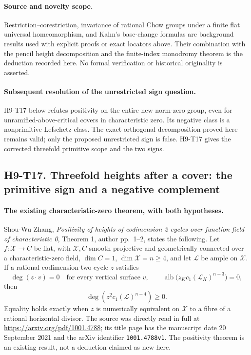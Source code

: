 \documentclass[11pt,a4paper]{article}
\begin{document}
\paragraph{Source and novelty scope.}
Restriction--corestriction, invariance of rational Chow groups under a
finite flat universal homeomorphism, and Kahn's base-change formulas
are background results used with explicit proofs or exact locators
above. Their combination with the pencil height decomposition and
the finite-index monodromy theorem is the deduction recorded here.
No formal verification or historical originality is asserted.

\paragraph{Subsequent resolution of the unrestricted sign question.}
H9-T17 below refutes positivity on the entire new norm-zero group, even
for unramified-above-critical covers in characteristic zero. Its negative
class is a nonprimitive Lefschetz class. The exact orthogonal decomposition
proved here remains valid; only the proposed unrestricted sign is false.
H9-T17 gives the corrected threefold primitive scope and the two signs.



\subsection*{H9-T17. Threefold heights after a cover: the primitive sign and a negative complement}

\paragraph{The existing characteristic-zero theorem, with both hypotheses.}
Shou-Wu Zhang, \emph{Positivity of heights of codimension 2 cycles
over function field of characteristic 0}, Theorem 1, author pp.~1--2,
states the following. Let $f:\mathcal X\to C$ be flat, with
$\mathcal X,C$ smooth projective and geometrically connected over a
characteristic-zero field, $\dim C=1$, $\dim\mathcal X=n\ge4$,
and let $\mathcal L$ be ample on $\mathcal X$. If a rational
codimension-two cycle $z$ satisfies
\[
 \deg(z\cdot v)=0\quad\text{for every vertical surface }v,
 \qquad
 \operatorname{alb}\bigl(z_Kc_1(\mathcal L_K)^{n-3}\bigr)=0,
                                                               \tag{H9.77}
\]
then
\[
                  \deg(z^2c_1(\mathcal L)^{n-4})\ge0.
                                                               \tag{H9.78}
\]
Equality holds exactly when $z$ is numerically equivalent on
$\mathcal X$ to a fibre of a rational horizontal divisor.
The source was directly read in full at
\url{https://arxiv.org/pdf/1001.4788}; its title page has the
manuscript date 20 September 2021 and the arXiv identifier
\texttt{1001.4788v1}. The positivity theorem is an existing result,
not a deduction claimed as new here.
\end{document}
